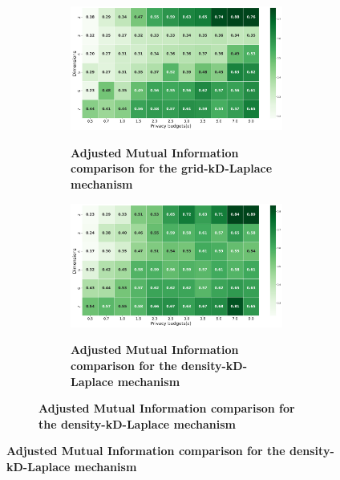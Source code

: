\begin{figure}[H]
    \centering
    \begin{subfigure}[b]{0.90\textwidth}
        \begin{subfigure}[c]{1\textwidth}
            \caption{\textbf{Adjusted Mutual Information comparison for the grid-kD-Laplace mechanism}}
            \includegraphics[width=1\textwidth]{Results/kd-laplace/grid-kd-Laplace/seeds-dataset/ami.png}
            \label{fig:ami_seeds-dataset_comparison_grid-kd_2d}
        \end{subfigure}
        \vfill %
        \begin{subfigure}[c]{1\textwidth}
            \caption{\textbf{Adjusted Mutual Information comparison for the density-kD-Laplace mechanism}}
            \includegraphics[width=1\textwidth]{Results/kd-laplace/density-kd-Laplace/seeds-dataset/ami.png}
            \label{fig:ami_seeds-dataset_comparison_density-kd_2d}
        \end{subfigure}
    \end{subfigure}
\end{figure}
\newpage

